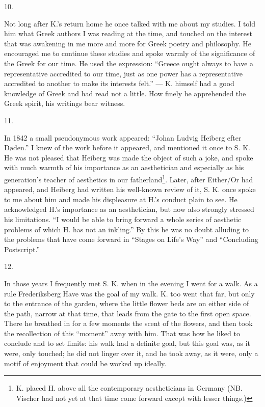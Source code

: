 \documentclass[12pt,a4paper,openany]{book}
\newcommand{\secnum}[1]{\par\begin{center}#1\end{center}\par\nobreak}
\newcommand{\opage}[1]{\marginnote{\footnotesize\textit{[#1]}}}
\begin{document}
\secnum{10.}

Not long after K.'s return home he once talked
with me about my studies. I told him what
Greek authors I was reading at the time, and touched on the
interest that was awakening in me more and more for
Greek poetry and philosophy. He encouraged me to
continue these studies and spoke warmly of the significance
of the Greek for our time. He used the expression:
``Greece ought always to have a representative
accredited to our time, just as one power has a representative
accredited to another to make its interests
\opage{346}felt.'' --- K. himself had a good knowledge of Greek and
had read not a little. How finely he apprehended the
Greek spirit, his writings bear witness.

\secnum{11.}

In 1842 a small pseudonymous work appeared: ``Johan
Ludvig Heiberg efter Døden.'' I knew of the work
before it appeared, and mentioned it once to S. K. He
was not pleased that Heiberg was made the object
of such a joke, and spoke with much
warmth of his importance as an aesthetician and especially
as his generation's teacher of aesthetics in our fatherland\footnote{K. placed H. above all the contemporary aestheticians in Germany (NB. Vischer had not yet at that time come forward except with lesser things.)}. Later, after Either/Or had appeared, and
Heiberg had written his well-known review of it,
S. K. once spoke to me about him and made his displeasure
at H.'s conduct plain to see. He
acknowledged H.'s importance as an aesthetician, but now also
strongly stressed his limitations. ``I would be able
to bring forward a whole series of aesthetic problems
of which H. has not an inkling.'' By this he was no doubt alluding
to the problems that have come forward in ``Stages
on Life's Way'' and ``Concluding Postscript.''

\secnum{12.}

In those years I frequently met S. K. when in the evening I
went for a walk. As a rule Frederiksberg
Have was the goal of my walk. K. too went that far,
but only to the entrance of the garden, where the little flower beds
are on either side of the path, narrow at that time,
that leads from the gate to the first open space. There he
breathed in for a few moments the scent of the flowers, and
\opage{347}then took the recollection of this ``moment'' away with him. That was
how he liked to conclude and to set limits: his walk had a definite goal,
but this goal was, as it were, only touched; he did not linger over it,
and he took away, as it were, only a motif of enjoyment that could be
worked up ideally.
\end{document}
